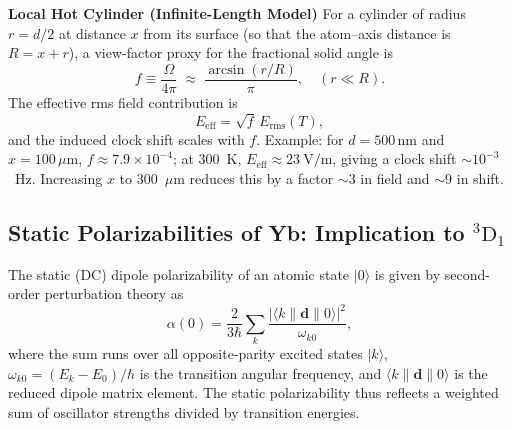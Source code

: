 \documentclass[aps,pra, onecolumn,superscriptaddress,nopacs,floatfix, showkeys, notitlepage]{revtex4-1}
\begin{document}
{\bf Local Hot Cylinder (Infinite-Length Model)}
For a cylinder of radius $r=d/2$ at distance $x$ from its surface (so that the atom--axis distance is $R=x+r$), a view-factor proxy for the fractional solid angle is
\begin{equation}
f \equiv \frac{\Omega}{4\pi}\;\approx\;\frac{\arcsin(r/R)}{\pi}, \quad (r\ll R).
\end{equation}
The effective rms field contribution is
\begin{equation}
E_\text{eff} = \sqrt{f}\,E_\mathrm{rms}(T),
\end{equation}
and the induced clock shift scales with $f$.  
Example: for $d=500\,\mathrm{nm}$ and $x=100\,\mu\mathrm{m}$, $f\approx 7.9\times10^{-4}$; at 300~K, $E_\text{eff}\approx 23~\mathrm{V/m}$, giving a clock shift $\sim 10^{-3}$~Hz.  
Increasing $x$ to 300~$\mu$m reduces this by a factor $\sim 3$ in field and $\sim 9$ in shift.


\subsection{Static Polarizabilities of Yb: Implication to ${}^3\mathrm{D}_1$}
The static (DC) dipole polarizability of an atomic state $|0\rangle$ is given by second-order perturbation theory as
\begin{equation}
    \alpha(0) = \frac{2}{3\hbar}\sum_k \frac{|\langle k \| \mathbf{d} \| 0 \rangle|^2}{\omega_{k0}},
\end{equation}
where the sum runs over all opposite-parity excited states $|k\rangle$, $\omega_{k0} = (E_k - E_0)/\hbar$ is the transition angular frequency, and $\langle k \| \mathbf{d} \| 0 \rangle$ is the reduced dipole matrix element. The static polarizability thus reflects a weighted sum of oscillator strengths divided by transition energies. 
\end{document}
